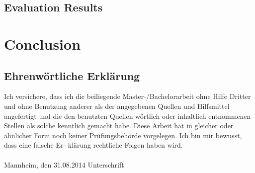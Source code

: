 \documentclass[a4paper, 11pt,titlepage,oneside,openany]{book}
\begin{document}
\section{Evaluation Results}
\chapter{Conclusion}

{}

\pagestyle{empty}

\newpage
\section*{Ehrenw\"ortliche Erkl\"arung}
Ich versichere, dass ich die beiliegende Master-/Bachelorarbeit ohne Hilfe Dritter
und ohne Benutzung anderer als der angegebenen Quellen und Hilfsmittel
angefertigt und die den benutzten Quellen w\"ortlich oder inhaltlich
entnommenen Stellen als solche kenntlich gemacht habe. Diese Arbeit
hat in gleicher oder \"ahnlicher Form noch keiner Pr\"ufungsbeh\"orde
vorgelegen. Ich bin mir bewusst, dass eine falsche Er- kl\"arung rechtliche Folgen haben
wird.
\\
\\

\noindent
Mannheim, den 31.08.2014 \hspace{4cm} Unterschrift
\end{document}
